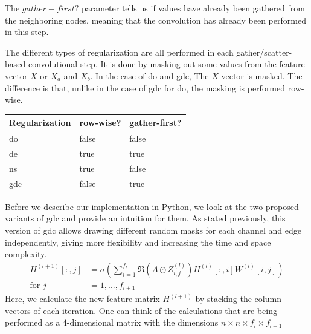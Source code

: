 The $\mathit{gather-first?}$ parameter tells us if values have already been gathered from the neighboring nodes, meaning that the convolution has already been performed in this step.

The different types of regularization are all performed in each gather/scatter-based convolutional step. It is done by masking out some values from the feature vector $X$ or $X_a$ and $X_b$.
In the case of \ac{do} and \ac{gdc}, The $X$ vector is masked.
The difference is that, unlike in the case of \ac{gdc} for \ac{do}, the masking is performed row-wise.

\begin{center}
    \begin{tabular}{lll}
        \toprule
        \textbf{Regularization} & \textbf{row-wise?} & \textbf{gather-first?} \\
        \midrule
        \acf{do}                & false              & false                  \\
        \acf{de}                & true               & true                   \\
        \acf{ns}                & true               & false                  \\
        \acf{gdc}               & false              & true                   \\

        \bottomrule
    \end{tabular}
\end{center}

Before we describe our implementation in Python, we look at the two proposed variants of \ac{gdc} and provide an intuition for them.
As stated previously, this version of \ac{gdc} allows drawing different random masks for each channel and edge independently, giving more flexibility and increasing the time and space complexity.
\begin{equation}
    \begin{aligned}
        H^{(l+1)}[:,j] & = \sigma \left(\sum_{i=1}^{f_{l}}\mathfrak{R}\left(A \odot Z_{i,j}^{(l)}\right)H^{(l)}[:,i]W^{(l)}[i,j]\right) \\
        \text{for } j  & = 1,..., f_{l+1}
    \end{aligned}
\end{equation}
Here, we calculate the new feature matrix $H^{(l+1)}$ by stacking the column vectors of each iteration. One can think of the calculations that are being performed as a $4$-dimensional matrix with the dimensions $n\times n\times f_{l}\times f_{l+1}$

